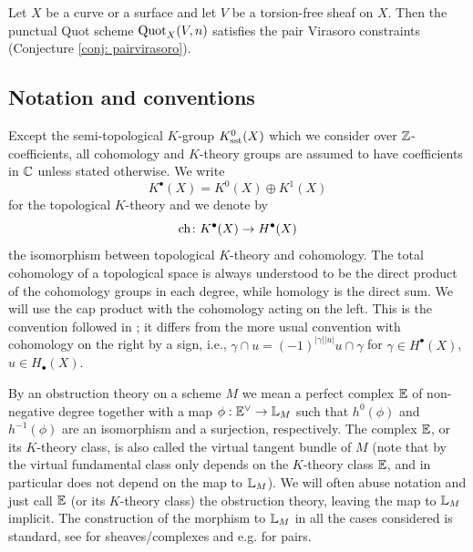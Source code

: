 \documentclass[a4paper, 12pt]{amsart}
\begin{document}
\begin{theorem}[=Theorem \ref{prop: quot}]\label{thm: punctualquot}
Let $X$ be a curve or a surface and let $V$ be a torsion-free sheaf on $X$. Then the punctual Quot scheme $\textup{Quot}_X(V, n)$ satisfies the pair Virasoro constraints (Conjecture \ref{conj: pairvirasoro}).
\end{theorem}


\subsection{Notation and conventions}
Except the semi-topological $K$-group $K_{\text{sst}}^0(X)$ which we consider over ${\mathbb{Z}}$-coefficients, all cohomology and $K$-theory groups are assumed to have coefficients in ${\mathbb{C}}$ unless stated otherwise. We write 
\[K^\bullet(X)=K^0(X)\oplus K^1(X)\]
for the topological $K$-theory and we denote by
\[\mathrm{ch}\colon K^\bullet(X)\to H^\bullet(X)\]
the isomorphism between topological $K$-theory and cohomology. The total cohomology of a topological space is always understood to be the direct product of the cohomology groups in each degree, while homology is the direct sum. We will use the cap product with the cohomology acting on the left. This is the convention followed in \cite{dold}; it differs from the more usual convention with cohomology on the right by a sign, i.e., $\gamma \cap u=(-1)^{|\gamma||u|}u\cap \gamma$ for $\gamma\in H^\bullet(X)$, $u\in H_\bullet(X)$. 

By an obstruction theory on a scheme $M$ we mean a perfect complex ${\mathbb{E}}$ of non-negative degree together with a map $\phi:{\mathbb{E}}^\vee\to {\mathbb{L}}_M$ such that $h^0(\phi)$ and $h^{-1}(\phi)$ are an isomorphism and a surjection, respectively. The complex ${\mathbb{E}}$, or its $K$-theory class, is also called the virtual tangent bundle of $M$ (note that by \cite{siebert} the virtual fundamental class only depends on the $K$-theory class ${\mathbb{E}}$, and in particular does not depend on the map to ${\mathbb{L}}_M$). We will often abuse notation and just call ${\mathbb{E}}$ (or its $K$-theory class) the obstruction theory, leaving the map to ${\mathbb{L}}_M$ implicit. The construction of the morphism to ${\mathbb{L}}_M$ in all the cases considered is standard, see \cite{huythomas} for sheaves/complexes and e.g. \cite[Section 5.3]{mochizuki} for pairs.
\end{document}
